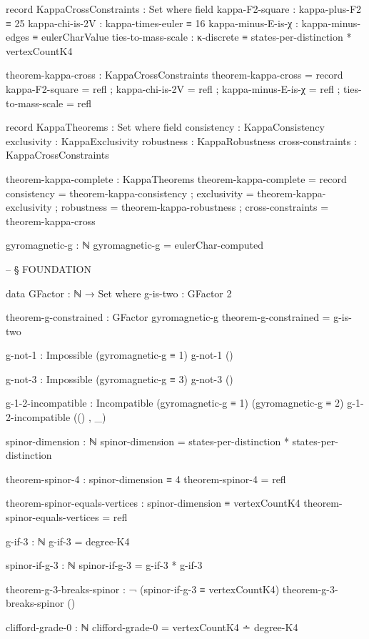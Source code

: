 \documentclass[11pt,a4paper]{book}
\begin{document}
\begin{code}
record KappaCrossConstraints : Set where
  field
    kappa-F2-square     : kappa-plus-F2 ≡ 25
    kappa-chi-is-2V     : kappa-times-euler ≡ 16
    kappa-minus-E-is-χ  : kappa-minus-edges ≡ eulerCharValue
    ties-to-mass-scale  : κ-discrete ≡ states-per-distinction * vertexCountK4

theorem-kappa-cross : KappaCrossConstraints
theorem-kappa-cross = record
  { kappa-F2-square     = refl
  ; kappa-chi-is-2V     = refl
  ; kappa-minus-E-is-χ  = refl
  ; ties-to-mass-scale  = refl
  }

record KappaTheorems : Set where
  field
    consistency      : KappaConsistency
    exclusivity      : KappaExclusivity
    robustness       : KappaRobustness
    cross-constraints : KappaCrossConstraints

theorem-kappa-complete : KappaTheorems
theorem-kappa-complete = record
  { consistency      = theorem-kappa-consistency
  ; exclusivity      = theorem-kappa-exclusivity
  ; robustness       = theorem-kappa-robustness
  ; cross-constraints = theorem-kappa-cross
  }


gyromagnetic-g : ℕ
gyromagnetic-g = eulerChar-computed



-- § FOUNDATION

data GFactor : ℕ → Set where
  g-is-two : GFactor 2

theorem-g-constrained : GFactor gyromagnetic-g
theorem-g-constrained = g-is-two

g-not-1 : Impossible (gyromagnetic-g ≡ 1)
g-not-1 ()

g-not-3 : Impossible (gyromagnetic-g ≡ 3)
g-not-3 ()

g-1-2-incompatible : Incompatible (gyromagnetic-g ≡ 1) (gyromagnetic-g ≡ 2)
g-1-2-incompatible (() , _)

spinor-dimension : ℕ
spinor-dimension = states-per-distinction * states-per-distinction

theorem-spinor-4 : spinor-dimension ≡ 4
theorem-spinor-4 = refl

theorem-spinor-equals-vertices : spinor-dimension ≡ vertexCountK4
theorem-spinor-equals-vertices = refl

g-if-3 : ℕ
g-if-3 = degree-K4

spinor-if-g-3 : ℕ
spinor-if-g-3 = g-if-3 * g-if-3

theorem-g-3-breaks-spinor : ¬ (spinor-if-g-3 ≡ vertexCountK4)
theorem-g-3-breaks-spinor ()

clifford-grade-0 : ℕ
clifford-grade-0 = vertexCountK4 ∸ degree-K4


\end{code}
\end{document}
